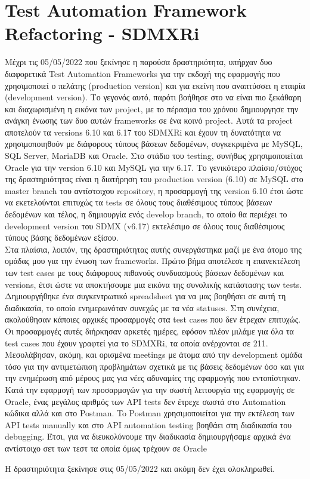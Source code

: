 \section*{Test Automation Framework Refactoring - SDMXRi}
Μέχρι τις 05/05/2022 που ξεκίνησε η παρούσα δραστηριότητα, υπήρχαν δυο διαφορετικά Test Automation Frameworks για την εκδοχή της εφαρμογής που χρησιμοποιεί ο πελάτης (production version) και για εκείνη που 
αναπτύσσει η εταιρία (development version). Το γεγονός αυτό, παρότι βοήθησε στο να είναι πιο ξεκάθαρη και διαχωρισμένη η εικόνα των project, με το 
πέρασμα του χρόνου δημιουργησε την ανάγκη ένωσης των δυο αυτών frameworks σε ένα κοινό project. Αυτά τα project αποτελούν τα versions 6.10 και 6.17 του SDMXRi 
και έχουν τη δυνατότητα να χρησιμοποιηθούν με διάφορους τύπους βάσεων δεδομένων, συγκεκριμένα με MySQL, SQL Server, MariaDB και Oracle. Στο στάδιο του testing, 
συνήθως χρησιμοποιείται Oracle για την version 6.10 και MySQL για την 6.17. Το γενικότερο πλαίσιο/στόχος της δραστηριότητας είναι η διατήρηση του production 
version (6.10) σε MySQL στο master branch του αντίστοιχου repository, η προσαρμογή της version 6.10 έτσι ώστε να εκετελούνται επιτυχώς τα tests σε όλους τους διαθέσιμους τύπους βάσεων δεδομένων και 
τέλος, η δημιουργία ενός develop branch, το οποίο θα περιέχει το development version του SDMX (v6.17) εκτελέσιμο σε όλους τους διαθέσιμους τύπους βάσης δεδομένων εξίσου. \\
Στα πλαίσια, λοιπόν, της δραστηριότητας αυτής συνεργάστηκα μαζί με ένα άτομο της ομάδας μου για την ένωση των frameworks. Πρώτο βήμα αποτέλεσε η επανεκτέλεση των test 
cases με τους διάφορους πιθανούς συνδυασμούς βάσεων δεδομένων και versions, έτσι ώστε να αποκτήσουμε μια εικόνα της συνολικής κατάστασης των tests. Δημιουργήθηκε ένα 
συγκεντρωτικό spreadsheet για να μας βοηθήσει σε αυτή τη διαδικασία, το οποίο ενημερωνόταν συνεχώς με τα νέα statuses. Στη συνέχεια, ακολούθησαν κάποιες αρχικές προσαρμογές στα test cases που δεν έτρεχαν επιτυχώς. 
Οι προσαρμογές αυτές διήρκησαν αρκετές ημέρες, εφόσον πλέον μιλάμε για όλα τα test cases που έχουν γραφτεί για το SDMXRi, τα οποία ανέρχονται σε 211. Μεσολάβησαν, ακόμη, και ορισμένα meetings με άτομα από 
την development ομάδα τόσο για την αντιμετώπιση προβλημάτων σχετικά με τις βάσεις δεδομένων όσο και για την ενημέρωση από μέρους μας για νέες αδυναμίες της εφαρμογής που εντοπίστηκαν. \\
Κατά την εφαρμογή των προσαρμογών για την σωστή λειτουργία της εφαρμογής σε Oracle, ένας μεγάλος αριθμός των API tests δεν έτρεχε σωστά στο Automation κώδικα αλλά και στο Postman. To Postman χρησιμοποιείται 
για την εκτέλεση των API tests manually και στο API automation testing βοηθάει στη διαδικασία του debugging. Έτσι, για να διευκολύνουμε την διαδικασία δημιουργήσαμε αρχικά ένα αντίστοιχο σετ των τεστ 
τα οποία όμως τρέχουν σε Oracle 

Η δραστηριότητα ξεκίνησε στις 05/05/2022 και ακόμη δεν έχει ολοκληρωθεί.

